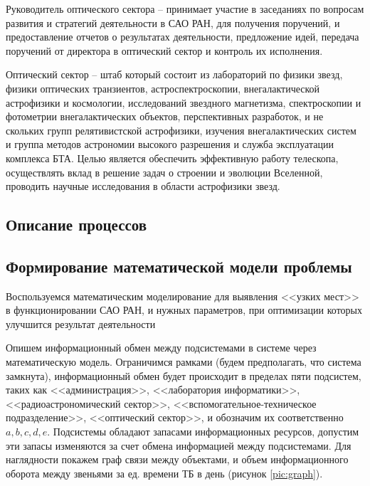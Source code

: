 Руководитель оптического сектора -- принимает участие в заседаниях по вопросам развития и стратегий деятельности в САО РАН, для получения поручений, и предоставление отчетов о результатах деятельности, предложение идей, передача поручений от директора в оптический сектор и контроль их исполнения.

Оптический сектор --  штаб который состоит из лабораторий по физики звезд, физики оптических транзиентов, астроспектроскопии, внегалактической астрофизики и космологии, исследований звездного магнетизма, спектроскопии и фотометрии внегалактических объектов,  перспективных разработок, и не скольких групп релятивистской астрофизики, изучения внегалактических систем и группа методов астрономии высокого разрешения и служба эксплуатации комплекса БТА. Целью является обеспечить эффективную работу телескопа, осуществлять вклад в решение задач о строении и эволюции Вселенной, проводить научные исследования в области астрофизики звезд.

 
\subsection{Описание процессов}

\subsection{Формирование математической модели проблемы}
Воспользуемся математическим моделирование для выявления <<узких мест>> в функционировании САО РАН, и нужных параметров, при оптимизации которых улучшится результат деятельности

Опишем информационный обмен между подсистемами в системе через математическую модель. Ограничимся рамками (будем предполагать, что система замкнута), информационный обмен будет  происходит в пределах пяти подсистем, таких как <<администрация>>, <<лаборатория информатики>>, <<радиоастрономический сектор>>, <<вспомогательное-техническое подразделение>>, <<оптический сектор>>, и обозначим их соответственно $a, b, c, d, e$. Подсистемы обладают запасами информационных ресурсов, допустим эти запасы изменяются за счет обмена информацией между подсистемами. Для наглядности покажем граф связи между объектами, и объем информационного оборота между звеньями за ед. времени ТБ в день (рисунок \ref{pic:graph}).




